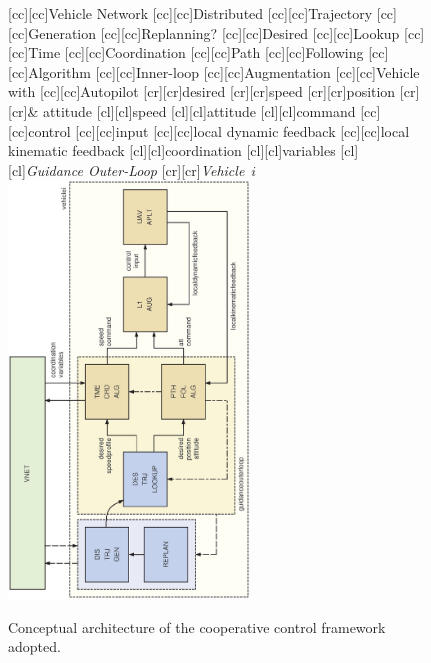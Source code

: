\documentclass[letter,onecolumn,12pt]{aiaa-tc}
\newcommand{\1}{1_n}
\begin{document}
\begin{figure}[ht]
    \centering
    \footnotesize
    [cc][cc]{\sf Vehicle Network}
    [cc][cc]{\sf Distributed}
    [cc][cc]{\sf Trajectory}
    [cc][cc]{\sf Generation}
    [cc][cc]{\sf Replanning?}
    [cc][cc]{\sf Desired}
    [cc][cc]{\sf Lookup}
    [cc][cc]{\sf Time}
    [cc][cc]{\sf Coordination}
    [cc][cc]{\sf Path}
    [cc][cc]{\sf Following}
    [cc][cc]{\sf Algorithm}
    [cc][cc]{\sf Inner-loop}
    [cc][cc]{\sf Augmentation}
    [cc][cc]{\sf Vehicle with}
    [cc][cc]{\sf Autopilot}
    [cr][cr]{\scriptsize \sf desired}
    [cr][cr]{\scriptsize \sf speed}
    [cr][cr]{\scriptsize \sf position}
    [cr][cr]{\scriptsize \sf \& attitude}
    [cl][cl]{\scriptsize \sf speed}
    [cl][cl]{\scriptsize \sf attitude}
    [cl][cl]{\scriptsize \sf command}
    [cc][cc]{\scriptsize \sf control}
    [cc][cc]{\scriptsize \sf input}
    [cc][cc]{\scriptsize \sf local dynamic feedback}
    [cc][cc]{\scriptsize \sf local kinematic feedback}
    [cl][cl]{\scriptsize \sf coordination}
    [cl][cl]{\scriptsize \sf variables}
    [cl][cl]{\sf \emph{Guidance Outer-Loop}}
    [cr][cr]{\sf \emph{Vehicle}~$i$}
    \includegraphics[width=0.57\textwidth,angle=-90]{figures/CPF/overallarchitecture.ps}
    \vspace{2mm}
    \caption{Conceptual architecture of the cooperative control framework adopted.}
    \label{fig:overall_architecture}
    \vspace{3mm}
\end{figure}
\end{document}
